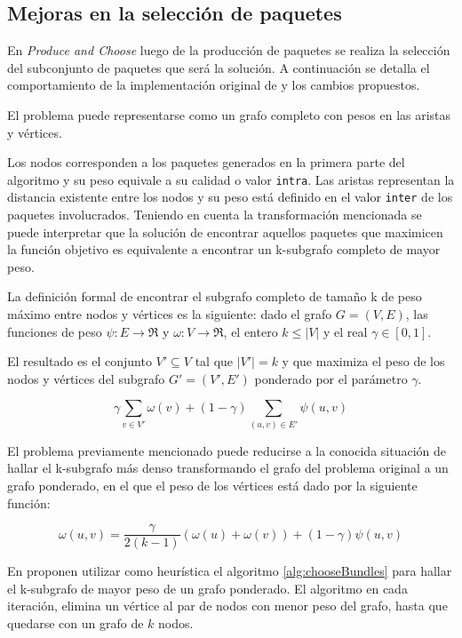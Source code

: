 \subsection{Mejoras en la selección de paquetes}
En \emph{Produce and Choose} luego de la producción de paquetes se realiza la selección del subconjunto de paquetes que será la solución. A continuación se detalla el comportamiento de la implementación original de \cite{journals/tkde/Amer-YahiaBCFMZ14} y los cambios propuestos.

El problema puede representarse como un grafo completo con pesos en las aristas y vértices. 

Los nodos corresponden a los paquetes generados en la primera parte del algoritmo y su peso equivale a su calidad o valor \texttt{intra}. Las aristas representan la distancia existente entre los nodos y su peso está definido en el valor \texttt{inter} de los paquetes involucrados. Teniendo en cuenta la transformación mencionada se puede interpretar que la solución de encontrar aquellos paquetes que maximicen la función objetivo es equivalente a encontrar un k-subgrafo completo de mayor peso.

La definición formal de encontrar el subgrafo completo de tamaño k de peso máximo entre nodos y vértices es la siguiente: dado el grafo $ G = (V,E) $, las funciones de peso $\psi : E \rightarrow \Re$ y $\omega : V \rightarrow \Re$, el entero $ k \leq |V| $ y el real $\gamma \in [0,1]$. 

El resultado es el conjunto $V' \subseteq V$ tal que $|V'| = k$ y que maximiza el peso de los nodos y vértices del subgrafo $G' = (V', E')$ ponderado por el parámetro $\gamma$.

\begin{equation}
\gamma \sum_{v \in V'}{\omega(v)} + (1 - \gamma) \sum_{(u,v) \in E'}{\psi(u,v)}
\end{equation}

El problema previamente mencionado puede reducirse a la conocida situación de hallar el k-subgrafo más denso \cite{DBLP:journals/algorithmica/FeigePK01} transformando el grafo del problema original a un grafo ponderado, en el que el peso de los vértices está dado por la siguiente función:
 
\begin{equation}
\omega(u,v) = \dfrac{\gamma}{2( k - 1)} (\omega(u) + \omega(v)) + (1 - \gamma)\psi(u,v) 
\end{equation}

En \cite{journals/tkde/Amer-YahiaBCFMZ14} proponen utilizar como heurística el algoritmo \ref{alg:chooseBundles} para hallar el k-subgrafo de mayor peso de un grafo ponderado. El algoritmo en cada iteración, elimina un vértice al par de nodos con menor peso del grafo, hasta que quedarse con un grafo de $k$ nodos.

